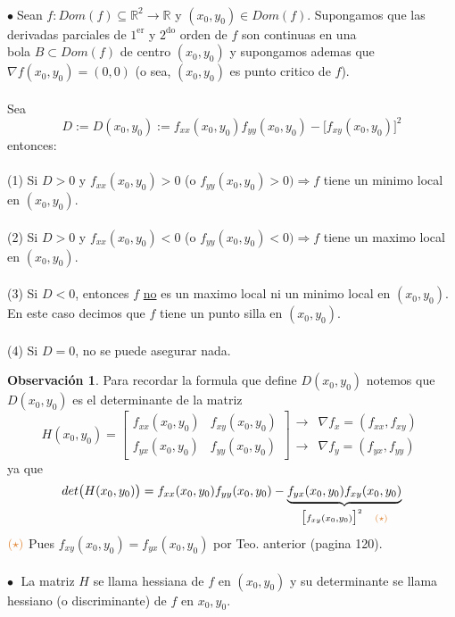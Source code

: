 \documentclass{article}
\theoremstyle{definition}
\newtheorem*{obs}{Observación}
\theoremstyle{remark}
\newcommand\bl{$\bullet\;$}
\begin{document}
\begin{teo}
   \;\\
  \bl Sean $ f : Dom(f) \subseteq \mathbb{R}^2 \to \mathbb{R}$ y $(x_0,y_0) \in Dom(f)$. Supongamos que las derivadas parciales de $1^{\text{er}}$ y $2^{\text{do}}$ orden de $f$ son continuas en una \\ bola $B \subset Dom(f)$ de centro $(x_0,y_0)$ y supongamos ademas que \\ $\nabla f (x_0,y_0)=(0,0)$ \quad \big(o sea, $(x_0,y_0)$ es punto critico de $f$\big).\\\\
  Sea $$  D := D(x_0,y_0) :=f_{xx}(x_0,y_0)f_{yy}(x_0,y_0)-
\big[f_{xy}(x_0,y_0)\big]^2
$$ entonces:\\\\
\textcolor{rojop2}{(1)}  Si $D>0$ y $f_{xx}(x_0,y_0) > 0$ \; \big(o $f_{yy}(x_0,y_0)>0\big) \Rightarrow  f$ tiene un minimo local en $(x_0,y_0)$. \\\\
\textcolor{rojop2}{(2)} Si $D>0$ y $f_{xx}(x_0,y_0) < 0$ \; \big(o $f_{yy}(x_0,y_0)<0\big) \Rightarrow  f$ tiene un maximo local en $(x_0,y_0)$. \\\\
\textcolor{rojop2}{(3)} Si $D<0$, entonces $f$ \underline{no} es un maximo local ni un minimo local en $(x_0,y_0)$. En este caso decimos que $f$ tiene un punto silla en $(x_0,y_0)$. \\\\
\textcolor{rojop2}{(4)} Si $D=0$, no se puede asegurar nada.
\end{teo}
\pagebreak
\begin{obs}
Para recordar la formula que define $D(x_0,y_0)$ notemos que $D(x_0,y_0)$ es el determinante de la matriz \[
  H(x_0,y_0)=\left[\begin{array}{ll}
  f_{xx}(x_0,y_0) & f_{xy}(x_0,y_0) \\
  f_{yx}(x_0,y_0) & f_{yy}(x_0,y_0)
\end{array}\right] \begin{array}{ll}
  \rightarrow & \nabla f_x=(f_{xx},f_{xy}) \\
\rightarrow & \nabla f_{y} = (f_{yx},f_{yy})
\end{array}
\]
ya que $$det\big(H(x_0,y_0)\big) =f_{xx}(x_0,y_0)f_{yy}(x_0,y_0)-\underbrace{f_{yx}(x_0,y_0)f_{xy}(x_0,y_0)}_{\big[f_{xy}(x_0,y_0)\big]^2 \quad\textcolor{rojop2}{(\star)}}$$ 
$\textcolor{rojop2}{(\star)}$ Pues $f_{xy}(x_0,y_0)=f_{yx}(x_0,y_0)$ por Teo. anterior (pagina 120). \\\\
\textcolor{rojop2}{\bl} La matriz $H$ se llama hessiana de $f$ en $(x_0,y_0)$ y su determinante se llama hessiano (o discriminante) de $f$ en $x_0,y_0$.
\end{obs}
\end{document}
